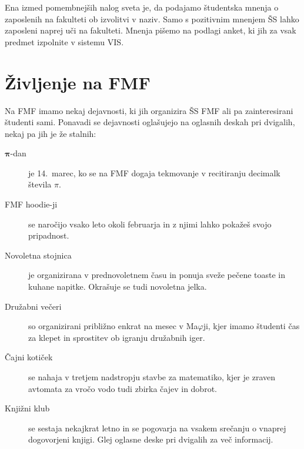 \documentclass[a4paper,notumble]{leaflet} %
\begin{document}
  Ena izmed pomembnejših nalog sveta je, da podajamo študentska mnenja o zaposlenih na fakulteti
  ob izvolitvi v naziv. Samo s pozitivnim mnenjem ŠS
  lahko zaposleni naprej uči na fakulteti. Mnenja pišemo na podlagi 
  anket, ki jih za vsak predmet izpolnite v sistemu VIS. 
  
  \vspace{-2ex}
  \section{Življenje na FMF}
  Na FMF imamo nekaj dejavnosti, ki jih organizira ŠS FMF
  ali pa zainteresirani študenti sami. Ponavadi se dejavnosti oglašujejo 
  na oglasnih deskah pri dvigalih, nekaj pa jih je že stalnih:
  \begin{description}
    \item[$\boldsymbol \pi$-dan] je 14.\ marec, ko se na FMF dogaja tekmovanje
    v recitiranju decimalk števila $\pi$.
    \item[FMF hoodie-ji] se naročijo vsako leto okoli februarja in z njimi lahko pokažeš svojo pripadnost.
    \item[Novoletna stojnica] je organizirana v prednovoletnem času in ponuja sveže pečene
    toaste in kuhane napitke. Okrašuje se tudi novoletna jelka.
    \item[Družabni večeri] so organizirani približno enkrat na mesec v Ma$\varphi$ji, 
    kjer imamo študenti čas za klepet in sprostitev ob igranju družabnih iger. 
    \item[Čajni kotiček] se nahaja v tretjem nadstropju stavbe za matematiko, kjer je zraven avtomata za vročo vodo tudi zbirka čajev in dobrot.
    \item[Knjižni klub] se sestaja nekajkrat letno in se pogovarja na vsakem 
    srečanju o vnaprej dogovorjeni knjigi. Glej oglasne deske pri dvigalih za več informacij.
  \end{description}
  \vspace{-1ex}
\end{document}
